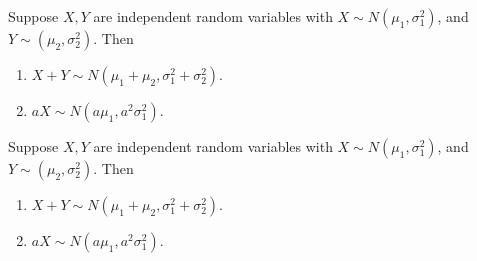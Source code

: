 \begin{note}
  \begin{field}
    \begin{thm}
      Suppose $X, Y$ are independent random variables with $X\sim N(\mu_1, \sigma_1^2)$, and $Y\sim (\mu_2, \sigma_2^2)$. Then
      \begin{enumerate}
        \item $X + Y \sim N(\mu_1 + \mu_2 , \sigma_1^2 + \sigma_2^2)$.
        \item $aX \sim N(a\mu_1, a^2 \sigma_1^2)$.
      \end{enumerate}
    \end{thm}
  \end{field}
  \begin{field}
    \begin{thm}
      Suppose $X, Y$ are independent random variables with $X\sim N(\mu_1, \sigma_1^2)$, and $Y\sim (\mu_2, \sigma_2^2)$. Then
      \begin{enumerate}
        \item $X + Y \sim N(\mu_1 + \mu_2 , \sigma_1^2 + \sigma_2^2)$.
        \item $aX \sim N(a\mu_1, a^2 \sigma_1^2)$.
      \end{enumerate}
    \end{thm}
  \end{field}
  \xplain{}%
\end{note}

